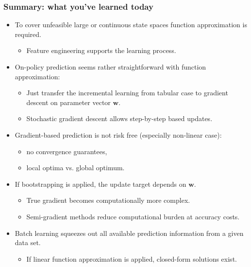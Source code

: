 \begin{frame}
\frametitle{Summary: what you've learned today}
\begin{itemize}
	\item To cover unfeasible large or continuous state spaces function approximation is required.
	\begin{itemize}\pause
		\item Feature engineering supports the learning process.\pause
	\end{itemize}
	\item On-policy prediction seems rather straightforward with function approximation:
	\begin{itemize}
		\item Just transfer the incremental learning from tabular case to gradient descent on parameter vector $\bm{w}$.\pause
		\item Stochastic gradient descent allows step-by-step based updates.\pause
	\end{itemize}
		\item Gradient-based prediction is not risk free (especially non-linear case):
	\begin{itemize}
		\item no convergence guarantees,
		\item local optima vs. global optimum.
	\end{itemize}
	\item If bootstrapping is applied, the update target depends on $\bm{w}$.
	\begin{itemize}
		\item True gradient becomes computationally more complex.\pause
		\item Semi-gradient methods reduce computational burden at accuracy costs.\pause
	\end{itemize}
	\item Batch learning squeezes out all available prediction information from a given data set.\pause
	\begin{itemize}
		\item If linear function approximation is applied, closed-form solutions exist.\pause
	\end{itemize}
\end{itemize}
\end{frame}